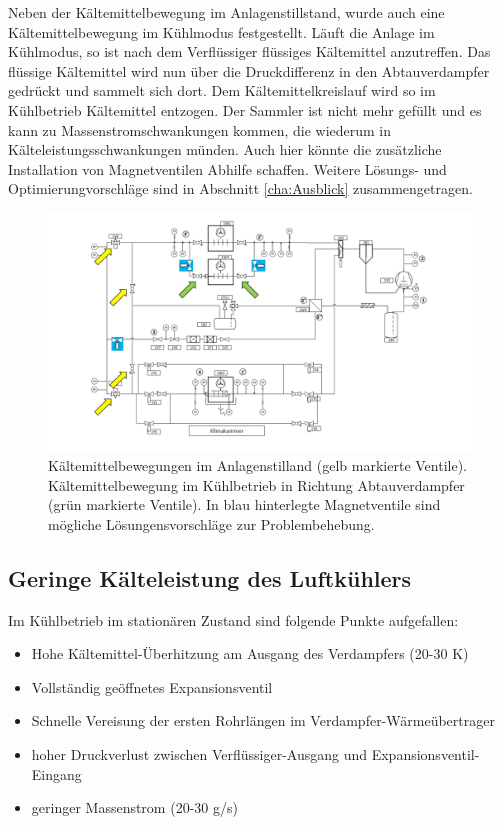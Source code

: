 Neben der Kältemittelbewegung im Anlagenstillstand, wurde auch eine Kältemittelbewegung im Kühlmodus festgestellt. Läuft die Anlage im Kühlmodus, so ist nach dem Verflüssiger flüssiges Kältemittel anzutreffen. Das flüssige Kältemittel wird nun über die Druckdifferenz in den Abtauverdampfer gedrückt und sammelt sich dort. Dem Kältemittelkreislauf wird so im Kühlbetrieb Kältemittel entzogen. Der Sammler ist nicht mehr gefüllt und es kann zu Massenstromschwankungen kommen, die wiederum in Kälteleistungsschwankungen münden. 
 Auch hier könnte die zusätzliche Installation von Magnetventilen Abhilfe schaffen. Weitere Lösungs- und Optimierungvorschläge sind in Abschnitt \ref{cha:Ausblick} zusammengetragen.  


\begin{figure}[htb]
\centering	
	\includegraphics[page=1,width=1.150\textwidth]{Pictures/Inbetriebnahme/Probleme.pdf}
\caption{Kältemittelbewegungen im Anlagenstilland (gelb markierte Ventile). Kältemittelbewegung im Kühlbetrieb in Richtung Abtauverdampfer (grün markierte Ventile). In blau hinterlegte Magnetventile sind mögliche Lösungensvorschläge zur Problembehebung.}
\label{fig:Problem1}
\end{figure}


\subsection*{Geringe Kälteleistung des Luftkühlers}

Im Kühlbetrieb im stationären Zustand sind folgende Punkte aufgefallen: 
\begin{itemize}
\item Hohe Kältemittel-Überhitzung am Ausgang des Verdampfers (20-30 K)
\item Vollständig geöffnetes Expansionsventil
\item Schnelle Vereisung der ersten Rohrlängen im Verdampfer-Wärmeübertrager
\item hoher Druckverlust zwischen Verflüssiger-Ausgang und Expansionsventil-Eingang
\item geringer Massenstrom (20-30 g/s)
\end{itemize}

